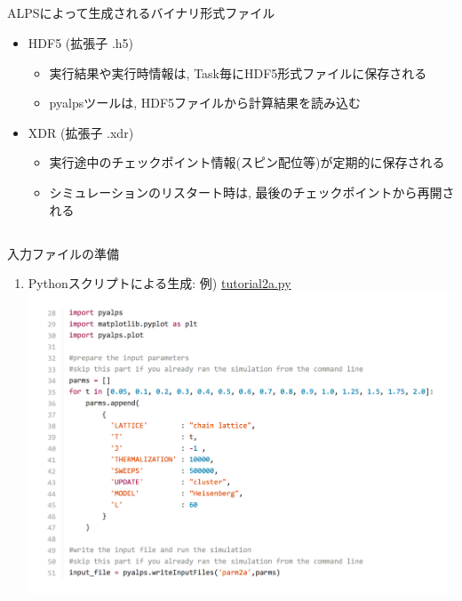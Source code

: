 \subsection*{\redm\whiteb\greenb}
\begin{frame}{ALPSによって生成されるバイナリ形式ファイル}
  \begin{itemize}
    \setlength{\itemsep}{1em}
  \item HDF5 (拡張子 {.h5})
    \begin{itemize}
    \item 実行結果や実行時情報は, Task毎にHDF5形式ファイルに保存される
    \item pyalpsツールは, HDF5ファイルから計算結果を読み込む
    \end{itemize}
  \item XDR (拡張子 {.xdr})
    \begin{itemize}
    \item 実行途中のチェックポイント情報(スピン配位等)が定期的に保存される
    \item シミュレーションのリスタート時は, 最後のチェックポイントから再開される
    \end{itemize}
  \end{itemize}
\end{frame}

\subsection*{\redm\whiteb\greenb}
\begin{frame}[t,fragile]{入力ファイルの準備}
  \begin{enumerate}
    \setlength{\itemsep}{1em}
  \item Pythonスクリプトによる生成: 例) \href{https://github.com/cmsi/alps-tutorial/blob/tutorials/tutorials/mc-02-susceptibilities/tutorial2a.py}{tutorial2a.py}
      \includegraphics[height=.72\textheight]{tutorial2a-1.pdf}
  \end{enumerate}
\end{frame}

